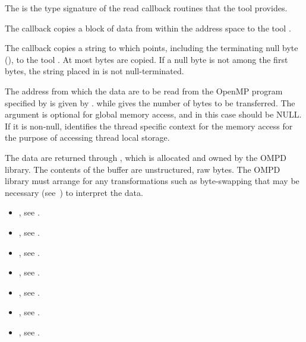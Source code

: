 \descr
The  is the type signature of the read 
callback routines that the tool provides. 

The  callback copies a block of data from  within 
the address space to the tool . 

The  callback copies a string to which  points, 
including the terminating null byte (), to the tool . 
At most  bytes are copied. If a null byte is not among the first 
 bytes, the string placed in  is not null-terminated.

\argdesc
The address from which the data are to be read from the OpenMP program
specified by  is given by . while
 gives the number of bytes to be transferred. The  
argument is optional for global memory access, and in this case should be NULL.
If it is non-null,  identifies the thread specific context 
for the memory access for the purpose of accessing thread local storage.

The data are returned through , which is allocated and owned by 
the OMPD library. The contents of the buffer are unstructured, raw bytes. The
OMPD library must arrange for any transformations such as byte-swapping that 
may be necessary (see~) 
to interpret the data.

\crossreferences
\begin{itemize}
\item {}, see .

\item {}, see .

\item {}, 
see .

\item {}, see .

\item {}, see .

\item {}, 
see .

\item {}, see .
\end{itemize}



